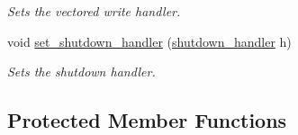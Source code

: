 \begin{DoxyCompactItemize}
\begin{DoxyCompactList}\small\item\em Sets the vectored write handler. \end{DoxyCompactList}\item 
void \mbox{\hyperlink{classwebsocketpp_1_1transport_1_1iostream_1_1connection_a37bb9ef90b3d183c238a32cf9f056d4b}{set\+\_\+shutdown\+\_\+handler}} (\mbox{\hyperlink{namespacewebsocketpp_1_1transport_1_1iostream_a3563ce2cca06b1466f7d76ecb8eb4a0b}{shutdown\+\_\+handler}} h)
\begin{DoxyCompactList}\small\item\em Sets the shutdown handler. \end{DoxyCompactList}\end{DoxyCompactItemize}
\subsection*{Protected Member Functions}
